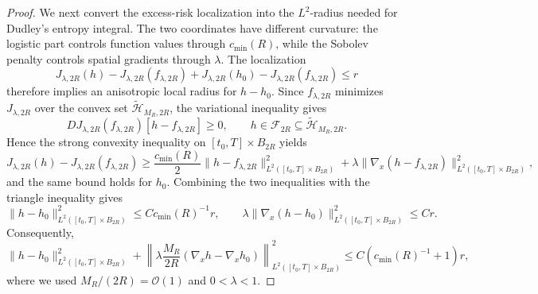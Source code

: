 \documentclass[11pt]{article}
\theoremstyle{plain}
\theoremstyle{definition}
\theoremstyle{remark}
\begin{document}
\begin{proof}
We next convert the excess-risk localization into the \(L^2\)-radius needed
for Dudley's entropy integral. The two coordinates have different curvature:
the logistic part controls function values through \(c_{\min}(R)\), while the
Sobolev penalty controls spatial gradients through \(\lambda\). The
localization
\[
J_{\lambda,2R}(h)-J_{\lambda,2R}(f_{\lambda,2R})
+
J_{\lambda,2R}(h_0)-J_{\lambda,2R}(f_{\lambda,2R})
\le r
\]
therefore implies an anisotropic local radius for \(h-h_0\). Since
\(f_{\lambda,2R}\) minimizes \(J_{\lambda,2R}\) over the convex set
\(\widetilde{\mathcal H}_{M_R,2R}\), the variational inequality gives
\[
DJ_{\lambda,2R}(f_{\lambda,2R})[h-f_{\lambda,2R}]\ge0,
\qquad
h\in\mathcal F_{2R}\subseteq\widetilde{\mathcal H}_{M_R,2R}.
\]
Hence the strong convexity inequality on \([t_0,T]\times B_{2R}\) yields
\[
J_{\lambda,2R}(h)-J_{\lambda,2R}(f_{\lambda,2R})
\ge
\frac{c_{\min}(R)}{2}
\|h-f_{\lambda,2R}\|_{L^2([t_0,T]\times B_{2R})}^2
+
\lambda
\|\nabla_x(h-f_{\lambda,2R})\|_{L^2([t_0,T]\times B_{2R})}^2,
\]
and the same bound holds for \(h_0\). Combining the two inequalities with
the triangle inequality gives
\[
\|h-h_0\|_{L^2([t_0,T]\times B_{2R})}^2
\le
C c_{\min}(R)^{-1}r,
\qquad
\lambda\|\nabla_x(h-h_0)\|_{L^2([t_0,T]\times B_{2R})}^2
\le
Cr.
\]
Consequently,
\[
\|h-h_0\|_{L^2([t_0,T]\times B_{2R})}^2
+
\left\|
\lambda\frac{M_R}{2R}
(\nabla_xh-\nabla_xh_0)
\right\|_{L^2([t_0,T]\times B_{2R})}^2
\le
C(c_{\min}(R)^{-1}+1)r,
\]
where we used \(M_R/(2R)=\mathcal{O}(1)\) and \(0<\lambda<1\).


\end{proof}
\end{document}

